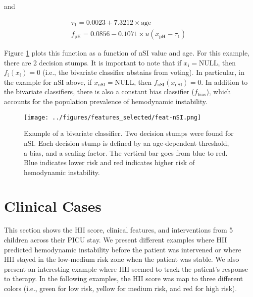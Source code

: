 \documentclass[
   technote
]{phildoc}
\newcommand{\ie}{i.e.,}
\newcommand{\hii}{HII}
\begin{document}
and

\begin{eqnarray}
\tau_{1} = 0.0023 + 7.3212 \times \text{age} \\
f_{\text{pH}} = 0.0856 - 0.1071 \times u(x_{\text{pH}}-\tau_{1})
\end{eqnarray}

Figure \ref{fig:clf_example_bivariate_clf} plots this function as a function of nSI value and age. For this example, there are 2 decision stumps. It is important to note that if $x_{i} = \text{NULL}$, then $f_{i}(x_{i})=0$ (\ie{} the bivariate classifier abstains from voting). In particular, in the example for nSI above, if $x_{\text{nSI}} = \text{NULL}$, then $f_{\text{nSI}}(x_{\text{nSI}}) = 0$. In addition to the bivariate classifiers, there is also a constant bias classifier ($f_{\text{bias}}$), which accounts for the population prevalence of hemodynamic instability. 

\begin{figure}[ht!]
	\centering
	\texttt{[image: ../figures/features\_selected/feat-nSI.png]}
	\caption{Example of a bivariate classifier. Two decision stumps were found for nSI. Each decision stump is defined by an age-dependent threshold, a bias, and a scaling factor. The vertical bar goes from blue to red. Blue indicates lower risk and red indicates higher risk of hemodynamic instability.} 
	\label{fig:clf_example_bivariate_clf}      
\end{figure}
 


\section{Clinical Cases}
\label{sec:clinical_cases}
This section shows the \hii{} score, clinical features, and interventions from 5 children across their PICU stay. We present different examples where \hii{} predicted hemodynamic instability before the patient was intervened or where \hii{} stayed in the low-medium risk zone when the patient was stable. We also present an interesting example where \hii{} seemed to track the patient's response to therapy. In the following examples, the \hii{} score was map to three different colors (\ie{} green for low risk, yellow for medium risk, and red for high risk).
    
\end{document}
